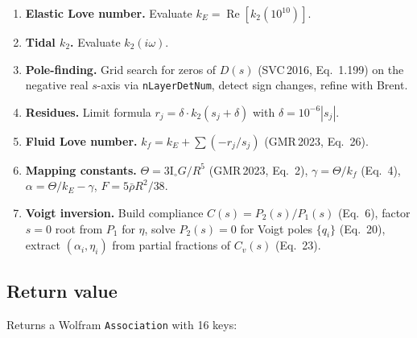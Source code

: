 \documentclass[11pt]{article}
\begin{document}
\begin{enumerate}
  \item \textbf{Elastic Love number.} Evaluate $k_E =
    \operatorname{Re}[k_2(10^{10})]$.
  \item \textbf{Tidal $k_2$.} Evaluate $k_2(i\omega)$.
  \item \textbf{Pole-finding.} Grid search for zeros of $D(s)$
    (SVC\,2016, Eq.~1.199) on the negative real $s$-axis via
    \texttt{nLayerDetNum}, detect sign changes, refine with Brent.
  \item \textbf{Residues.} Limit formula
    $r_j = \delta\cdot k_2(s_j + \delta)$ with
    $\delta = 10^{-6}|s_j|$.
  \item \textbf{Fluid Love number.}
    $k_f = k_E + \sum(-r_j/s_j)$
    (GMR\,2023, Eq.~26).
  \item \textbf{Mapping constants.} $\Theta = 3\mathrm{I}_\circ G/R^5$
    (GMR\,2023, Eq.~2),
    $\gamma = \Theta/k_f$ (Eq.~4),
    $\alpha = \Theta/k_E - \gamma$,
    $F = 5\bar\rho R^2/38$.
  \item \textbf{Voigt inversion.} Build compliance
    $C(s) = P_2(s)/P_1(s)$ (Eq.~6), factor $s=0$ root from $P_1$
    for $\eta$, solve $P_2(s) = 0$ for Voigt poles $\{q_i\}$
    (Eq.~20), extract $(\alpha_i, \eta_i)$ from partial fractions
    of $C_v(s)$ (Eq.~23).
\end{enumerate}

\subsection{Return value}

Returns a Wolfram \texttt{Association} with 16 keys:
\end{document}
